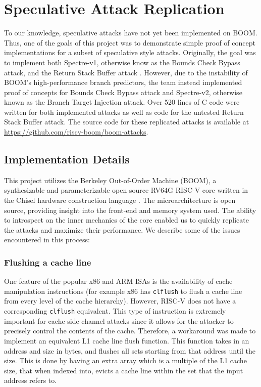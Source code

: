 \section{Speculative Attack Replication} \label{Speculative Attack Replication}

To our knowledge, speculative attacks have not yet been implemented on BOOM. Thus,
one of the goals of this project was to demonstrate simple proof of concept implementations for a
subset of speculative style attacks. Originally, the goal was to implement both 
Spectre-v1, otherwise know as the Bounds Check Bypass attack, and the Return Stack Buffer attack \cite{b3}.
However, due to the instability of BOOM's high-performance branch predictors, the team instead implemented
proof of concepts for Bounds Check Bypass attack and Spectre-v2, otherwise known as the
Branch Target Injection attack. Over 520 lines of C code were written for both implemented attacks as well as 
code for the untested Return Stack Buffer attack. The source code for these replicated attacks is available at
\url{https://github.com/riscv-boom/boom-attacks}.

\subsection{Implementation Details}

This project utilizes the Berkeley Out-of-Order Machine (BOOM), a synthesizable and 
parameterizable open source RV64G RISC-V core written in the Chisel hardware construction language \cite{b49}. 
The microarchitecture is open source, providing insight into the front-end and memory system
used. The ability to introspect on the inner mechanics of the core enabled us to quickly replicate 
the attacks and maximize their performance. We describe some of the issues encountered in this process:

\subsubsection{Flushing a cache line}

One feature of the popular x86 and ARM ISAs is the availability of cache manipulation instructions
(for example x86 has {\tt clflush} to flush a cache line from every level of the cache hierarchy).
However, RISC-V does not have a corresponding {\tt clflush} equivalent.
This type of instruction is extremely important for cache side channel attacks since it allows for
the attacker to precisely control the contents of the cache.
Therefore, a workaround was made to implement an equivalent
L1 cache line flush function. This function takes in an address and size in bytes, and flushes
all sets starting from that address until the size. This is done by having an extra array which 
is a multiple of the L1 cache size, that when indexed into, evicts a cache line within the set that the input
address refers to.

